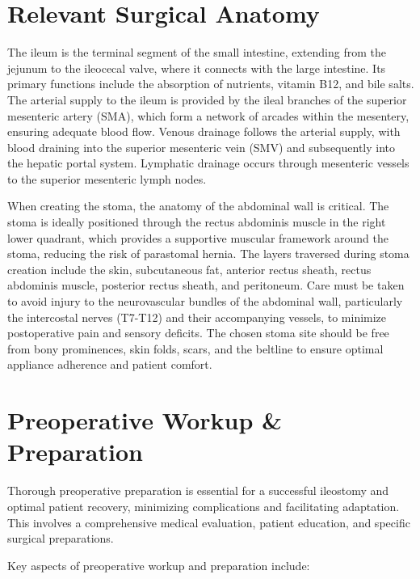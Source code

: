 \section*{Relevant Surgical Anatomy}
The ileum is the terminal segment of the small intestine, extending from the jejunum to the ileocecal valve, where it connects with the large intestine. Its primary functions include the absorption of nutrients, vitamin B12, and bile salts. The arterial supply to the ileum is provided by the ileal branches of the superior mesenteric artery (SMA), which form a network of arcades within the mesentery, ensuring adequate blood flow. Venous drainage follows the arterial supply, with blood draining into the superior mesenteric vein (SMV) and subsequently into the hepatic portal system. Lymphatic drainage occurs through mesenteric vessels to the superior mesenteric lymph nodes.

When creating the stoma, the anatomy of the abdominal wall is critical. The stoma is ideally positioned through the rectus abdominis muscle in the right lower quadrant, which provides a supportive muscular framework around the stoma, reducing the risk of parastomal hernia. The layers traversed during stoma creation include the skin, subcutaneous fat, anterior rectus sheath, rectus abdominis muscle, posterior rectus sheath, and peritoneum. Care must be taken to avoid injury to the neurovascular bundles of the abdominal wall, particularly the intercostal nerves (T7-T12) and their accompanying vessels, to minimize postoperative pain and sensory deficits. The chosen stoma site should be free from bony prominences, skin folds, scars, and the beltline to ensure optimal appliance adherence and patient comfort.

\section*{Preoperative Workup \& Preparation}
Thorough preoperative preparation is essential for a successful ileostomy and optimal patient recovery, minimizing complications and facilitating adaptation. This involves a comprehensive medical evaluation, patient education, and specific surgical preparations.

Key aspects of preoperative workup and preparation include:

